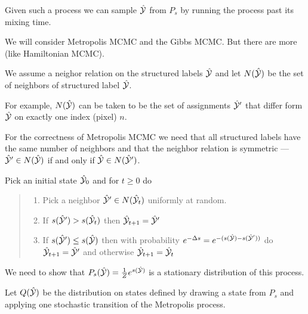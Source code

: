 {\vfill
Given such a process we can sample $\hat{\cal Y}$ from $P_s$ by running the process past its mixing time.

\vfill
We will consider Metropolis MCMC and the Gibbs MCMC.  But there are more (like Hamiltonian MCMC).


We assume a neighor relation on the structured labels $\hat{\cal Y}$ and let $N(\hat{\cal Y})$ be the set of neighbors of structured label $\hat{\cal Y}$.

\vfill
For example, $N(\hat{\cal Y})$ can be taken to be the set of assignments $\hat{\cal Y}'$ that differ form $\hat{\cal Y}$ on exactly one index (pixel) $n$.

\vfill
For the correctness of Metropolis MCMC we need that all structured labels have the same number of neighbors and that the neighbor relation is symmetric ---
$\hat{\cal Y}' \in N(\hat{\cal Y})$ if and only if $\hat{\cal Y} \in N(\hat{\cal Y}')$.


Pick an initial state $\hat{\cal Y}_0$ and for $t \geq 0$ do

\vfill
\begin{quotation}

    \noindent \begin{enumerate}
    \item Pick a neighbor $\hat{\cal Y}' \in N(\hat{\cal Y}_t)$ uniformly at random.

    \vfill      
    \item If $s(\hat{\cal Y}') > s(\hat{\cal Y}_t)$ then {\color{red} $\hat{\cal Y}_{t+1} = \hat{\cal Y}'$}

    \vfill      
    \item If $s(\hat{\cal Y}') \leq s(\hat{\cal Y})$ then with probability $e^{-\Delta s} = e^{-(s(\hat{\cal Y}) - s(\hat{\cal Y}'))}$
   do  {\color{red} $\hat{\cal Y}_{t+1} = \hat{\cal Y}'$} and otherwise {\color{red} $\hat{\cal Y}_{t+1} = \hat{\cal Y}_t$} 
  \end{enumerate}  
\end{quotation}

We need to show that $P_s(\hat{\cal Y}) = \frac{1}{Z}e^{s(\hat{\cal Y})}$ is a stationary distribution of this process.

\vfill
Let $Q(\hat{\cal Y})$ be the distribution on states defined by drawing a state from $P_s$ and applying one stochastic transition of the Metropolis process.

}
